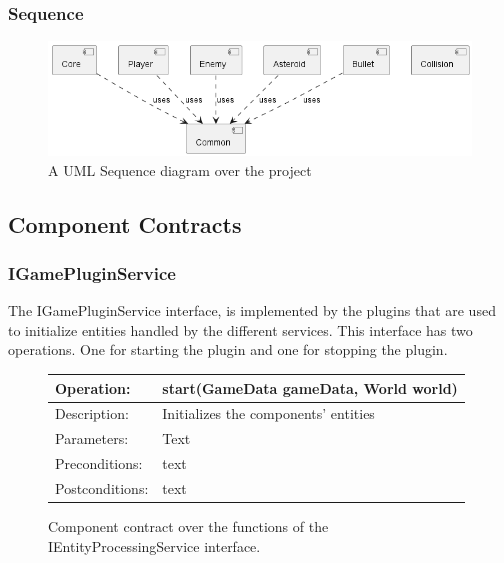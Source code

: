 \subsubsection{Sequence}
\begin{figure}[H]
	\includegraphics[width=\textwidth]{images/diagrams/component.png}
	\caption{A UML Sequence diagram over the project}
\end{figure}

\subsection{Component Contracts}
\subsubsection{IGamePluginService}
The IGamePluginService interface, is implemented by the plugins that are used to initialize entities handled by the different services.
This interface has two operations. One for starting the plugin and one for stopping the plugin.
\begin{figure}[H]
	\begin{center}
		\begin{tabulary}{1.0\textwidth}{lL}
			\toprule
			Operation:      & start(GameData gameData, World world) \\
			\midrule
			Description:     & Initializes the components' entities  \\
			\midrule
			Parameters:      & Text          \\
			\midrule
			Preconditions:   & text                                  \\
			\midrule
			Postconditions:  & text                                  \\
			\bottomrule
		\end{tabulary}
	\end{center}
	\caption{Component contract over the functions of the IEntityProcessingService interface.}
\end{figure}

